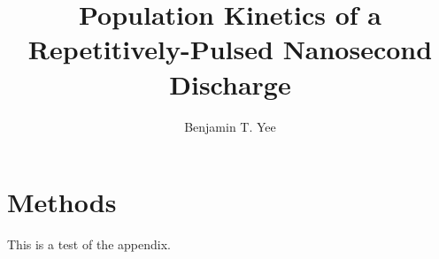 \documentclass[12pt]{./tex/thesis-umich}
\title{Population Kinetics of a Repetitively-Pulsed Nanosecond Discharge}
\author{Benjamin T. Yee}
\begin{document}
  


  



  \appendix
    \chapter{Methods}
      This is a test of the appendix.


\end{document}
